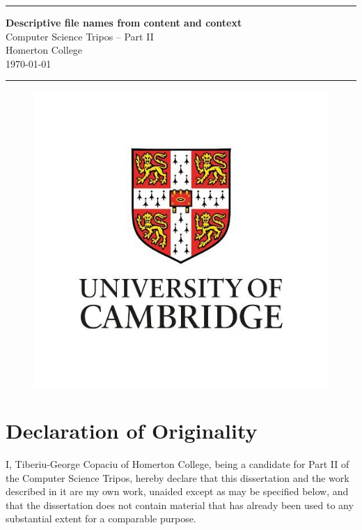 \documentclass[12pt,a4paper,oneside]{report}
\newcommand{\HRulee}{\rule{\linewidth}{0.5mm}}
\begin{document}




\pagestyle{empty}


\vspace*{60mm}
\HRulee
\begin{center}

  \Huge
  \textbf{Descriptive file names from content and context} \\[5mm]
  Computer Science Tripos -- Part II \\[5mm]
  Homerton College \\[5mm]
  \today  %
\end{center}
\HRulee
\begin{figure}[H]
  \centering
  \includegraphics[scale = 0.5]{Images/logo2.jpg}
\end{figure}


\pagestyle{plain}
\newpage

\section*{Declaration of Originality}
I, Tiberiu-George Copaciu of Homerton College,
being a candidate for Part II of the Computer Science Tripos,
hereby declare that this dissertation and the work described in it
are my own work, unaided except as may be specified below, and
that the dissertation does not contain material that has already
been used to any substantial extent for a comparable purpose. \\
\end{document}

